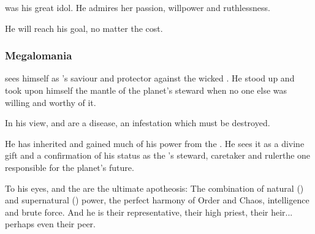 \TyarithXserasshana{} was his great idol. 
He admires her passion, willpower and ruthlessness. 


He will reach his goal, no matter the cost.






\subsubsection{Megalomania}
\Secherdamon{} sees himself as \Miith{}'s saviour and protector against the wicked \banes. He stood up and took upon himself the mantle of the planet's steward when no one else was willing and worthy of it. 

In his view, \resphain{} and \humans{} are a disease, an infestation which must be destroyed. 


He has inherited and gained much of his power from the \firstgendragons. He sees it as a divine gift and a confirmation of his status as the \Miith{}'s steward, caretaker and ruler\dash the one responsible for the planet's future. 

To his eyes, \Tiamat{} and the \firstgendragons{} are the ultimate apotheosis: The combination of natural (\ophidian) and supernatural (\xzaishannic) power, the perfect harmony of Order and Chaos, intelligence and brute force. And he is their representative, their high priest, their heir... perhaps even their peer. 


